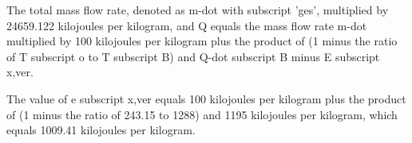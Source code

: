 The total mass flow rate, denoted as m-dot with subscript 'ges', multiplied by 24659.122 kilojoules per kilogram, and Q equals the mass flow rate m-dot multiplied by 100 kilojoules per kilogram plus the product of (1 minus the ratio of T subscript o to T subscript B) and Q-dot subscript B minus E subscript x,ver.

The value of e subscript x,ver equals 100 kilojoules per kilogram plus the product of (1 minus the ratio of 243.15 to 1288) and 1195 kilojoules per kilogram, which equals 1009.41 kilojoules per kilogram.